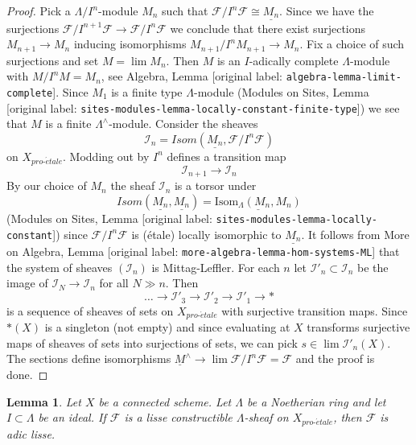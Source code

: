 \documentclass[10pt,a4paper]{article}
\theoremstyle{plain}
\newtheorem{lemma}[subsection]{Lemma}
\theoremstyle{definition}
\theoremstyle{remark}
\numberwithin{equation}{subsection}
\def\lim{\mathop{\mathrm{lim}}\nolimits}
\def\proetale{{pro\text{-}\acute{e}tale}}
\begin{document}
\begin{proof}
Pick a $\Lambda/I^n$-module $M_n$ such that
$\mathcal{F}/I^n\mathcal{F} \cong \underline{M_n}$.
Since we have the surjections
$\mathcal{F}/I^{n + 1}\mathcal{F} \to \mathcal{F}/I^n\mathcal{F}$
we conclude that there
exist surjections $M_{n + 1} \to M_n$ inducing isomorphisms
$M_{n + 1}/I^nM_{n + 1} \to M_n$. Fix a choice of such surjections
and set $M = \lim M_n$. Then $M$ is an $I$-adically complete
$\Lambda$-module with $M/I^nM = M_n$, see
Algebra, Lemma [original label: \nolinkurl{algebra-lemma-limit-complete}].
Since $M_1$ is a finite type $\Lambda$-module
(Modules on Sites, Lemma
[original label: \nolinkurl{sites-modules-lemma-locally-constant-finite-type}])
we see that $M$ is a finite $\Lambda^\wedge$-module.
Consider the sheaves
$$
\mathcal{I}_n = \mathit{Isom}(\underline{M_n}, \mathcal{F}/I^n\mathcal{F})
$$
on $X_\proetale$. Modding out by $I^n$ defines a transition map
$$
\mathcal{I}_{n + 1} \longrightarrow \mathcal{I}_n
$$
By our choice of $M_n$ the sheaf $\mathcal{I}_n$ is a torsor under
$$
\mathit{Isom}(\underline{M_n}, \underline{M_n}) =
\underline{\text{Isom}_\Lambda(M_n, M_n)}
$$
(Modules on Sites, Lemma [original label: \nolinkurl{sites-modules-lemma-locally-constant}])
since $\mathcal{F}/I^n\mathcal{F}$ is (\'etale) locally isomorphic
to $\underline{M_n}$. It follows from
More on Algebra, Lemma [original label: \nolinkurl{more-algebra-lemma-hom-systems-ML}]
that the system of sheaves $(\mathcal{I}_n)$ is Mittag-Leffler.
For each $n$ let $\mathcal{I}'_n \subset \mathcal{I}_n$ be the
image of $\mathcal{I}_N \to \mathcal{I}_n$ for all $N \gg n$.
Then
$$
\ldots \to \mathcal{I}'_3 \to \mathcal{I}'_2 \to \mathcal{I}'_1 \to *
$$
is a sequence of sheaves of sets on $X_\proetale$ with surjective
transition maps. Since $*(X)$ is a singleton (not empty)
and since evaluating at $X$ transforms surjective maps of sheaves of sets
into surjections of sets, we can pick
$s \in \lim \mathcal{I}'_n(X)$. The sections define isomorphisms
$\underline{M}^\wedge \to \lim \mathcal{F}/I^n\mathcal{F} = \mathcal{F}$
and the proof is done.
\end{proof}

\begin{lemma}
\label{lemma-connected-lisse}
Let $X$ be a connected scheme. Let $\Lambda$ be a Noetherian ring and let
$I \subset \Lambda$ be an ideal. If $\mathcal{F}$ is a lisse
constructible $\Lambda$-sheaf on $X_\proetale$, then $\mathcal{F}$
is adic lisse.
\end{lemma}
\end{document}
